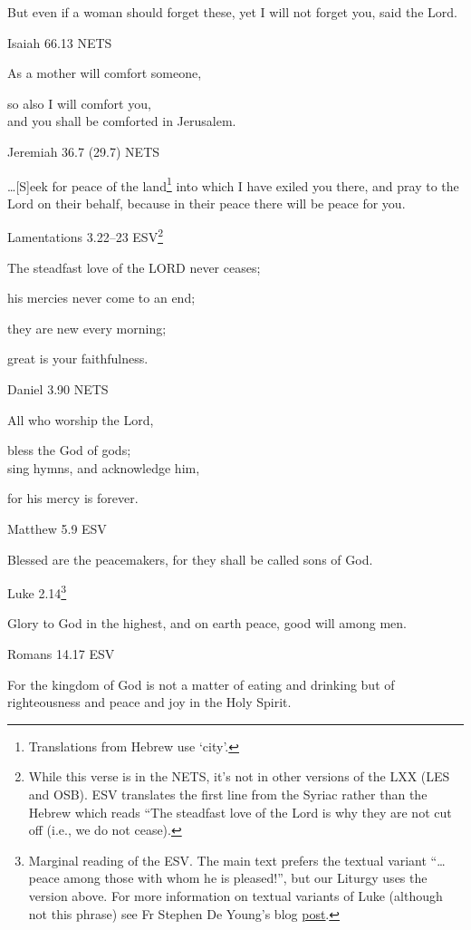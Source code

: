 \documentclass[
]{article}
\begin{document}
But even if a woman should forget these, yet I will not forget you, said
the Lord.

Isaiah 66.13 NETS

As a mother will comfort someone,

so also I will comfort you,\\
and you shall be comforted in Jerusalem.

Jeremiah 36.7 (29.7) NETS

\ldots{[}S{]}eek for peace of the land\footnote{Translations from Hebrew
  use `city'.} into which I have exiled you there, and pray to the Lord
on their behalf, because in their peace there will be peace for you.

Lamentations 3.22--23 ESV\footnote{While this verse is in the NETS, it's
  not in other versions of the LXX (LES and OSB). ESV translates the
  first line from the Syriac rather than the Hebrew which reads ``The
  steadfast love of the Lord is why they are not cut off (i.e., we do
  not cease).}

The steadfast love of the LORD never ceases;

his mercies never come to an end;

they are new every morning;

great is your faithfulness.

Daniel 3.90 NETS

All who worship the Lord,

bless the God of gods;\\
sing hymns, and acknowledge him,

for his mercy is forever.

Matthew 5.9 ESV

Blessed are the peacemakers, for they shall be called sons of God.

Luke 2.14\footnote{Marginal reading of the ESV. The main text prefers
  the textual variant ``\ldots peace among those with whom he is
  pleased!'', but our Liturgy uses the version above. For more
  information on textual variants of Luke (although not this phrase) see
  Fr Stephen De Young's blog
  \href{https://blogs.ancientfaith.com/wholecounsel/2021/03/31/the-two-lukes/}{\ul{post}}.}

Glory to God in the highest, and on earth peace, good will among men.

Romans 14.17 ESV

For the kingdom of God is not a matter of eating and drinking but of
righteousness and peace and joy in the Holy Spirit.
\end{document}
